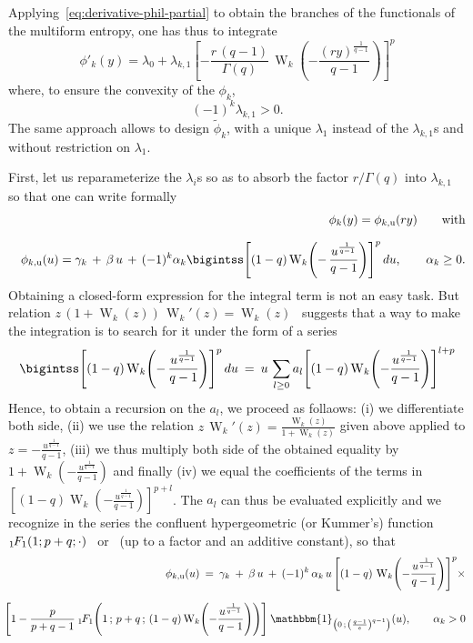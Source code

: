 \documentclass[entropy,article,submit,moreauthors,pdftex]{Definitions/mdpi}
\def\un{\mathbbm{1}}%
\def\W{\operatorname{W}} %
\newcommand{\hypgeom}[2]{\mbox{}_{#1}\hspace{-1pt}F_{#2}}%
\def\u{\mathrm{u}}
\begin{document}
Applying~\eqref{eq:derivative-phil-partial}  to  obtain   the  branches  of  the
functionals of the multiform entropy, one has thus to integrate
%
\[
\phi'_k(y) = \lambda_0 + \lambda_{k,1}  \left[ - \frac{r \, (q-1)}{\Gamma(q)} \,
  \W_k\left( - \frac{\left( r y \right)^{\frac{1}{q-1}}}{q-1} \right) \right]^p
\]
%
where, to ensure the convexity of the $\phi_k$,
%
\[
(-1)^k \lambda_{k,1} > 0.
\]
%
The  same  approach  allows  to   design  $\widetilde{\phi}_k$,  with  a  unique
$\lambda_1$  instead   of  the  $\lambda_{k,1}$s  and   without  restriction  on
$\lambda_1$.

First,  let us  reparameterize  the  $\lambda_i$s so  as  to  absorb the  factor
$r/\Gamma(q)$ into $\lambda_{k,1}$ so that one can write formally
%
\begin{eqnarray*}
&&\phi_k(y) = \phi_{k,\u}(r y)  \qquad \mbox{with}
\\[2.5mm]
&& \phi_{k,\u}(u) = \gamma_k \, + \, \beta \, u \, + \, (-1)^k \alpha_k
\bigintss \left[ (1-q) \W_k\left( - \, \frac{u^{\frac{1}{q-1}}}{q-1} \right)
  \right]^p \, du, \qquad \alpha_k \ge 0.
\end{eqnarray*}
%
Obtaining a  closed-form expression for the  integral term is not  an easy task.
But relation  $z \, (1+\W_k(z)) \,  \W_k'(z) = \W_k(z)$~\cite[Eq.~3.2]{CorGon96}
suggests that a way  to make the integration is to search for  it under the form
of a series
%
\[
\bigintss  \left[ (1-q)  \W_k\left( -  \, \frac{u^{\frac{1}{q-1}}}{q-1}  \right)
  \right]^p \,  du \: =  \: u \,  \sum_{l \ge 0}  a_l \left[ (1-q)  \W_k\left( -
  \frac{u^{\frac{1}{q-1}}}{q-1} \right) \right]^{l+p}
\]
%
Hence,  to obtain  a recursion  on the  $a_l$, we  proceed as  follaows: (i)  we
differentiate  both   side,  (ii)  we  use   the  relation  $z  \,   \W_k'(z)  =
\frac{\W_k(z)}{1+\W_k(z)}$     given      above     applied     to      $z     =
-\frac{u^{\frac{1}{q-1}}}{q-1}$,  (iii)  we  thus  multiply  both  side  of  the
obtained equality by $1+\W_k\left(  - \frac{u^{\frac{1}{q-1}}}{q-1} \right)$ and
finally (iv) we equal the coefficients  of the terms in $\left[ (1-q) \W_k\left(
  - \frac{u^{\frac{1}{q-1}}}{q-1} \right) \right]^{p+l}$. The  $a_l$ can thus be
evaluated explicitly and we recognize in the series the confluent hypergeometric
(or      Kummer's)       function      $\hypgeom{1}{1}(1      ;       p+q      ;
\cdot)$~\cite[Eq.~13.1.2]{AbrSte70}  or~\cite[Eq.~9.210-1]{GraRyz15}  (up  to  a
factor and an additive constant), so that
%
\begin{eqnarray*}
  &&\phi_{k,\u}(u) \: = \: \gamma_k \: + \: \beta \, u \: + \: (-1)^k \,
  \alpha_k \, u \, \left[ (1-q) \, \W_k\left( - \frac{u^{\frac{1}{q-1}}}{q-1}
    \right) \right]^p \times
  \\[2.5mm]
  &&\hspace{-5mm}\left[ 1 - \frac{p}{p+q-1} \: \hypgeom{1}{1}\left( 1 \, ; \,
    p+q \, ; \, (1-q) \W_k \left( - \frac{u^{\frac{1}{q-1}}}{q-1} \right)
    \right) \right] \: \un_{\left( 0 \, ; \, \left( \frac{q-1}{e} \right)^{q-1}
    \right)}(u), \qquad \alpha_k > 0
\end{eqnarray*}
\end{document}
